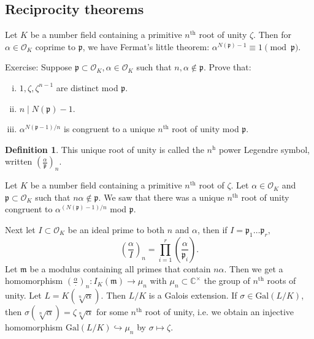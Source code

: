 \documentclass{article}
\theoremstyle{definition}
\newtheorem{defn}[theorem]{Definition}
\begin{document}
\subsection{Reciprocity theorems}
Let $K$ be a number field containing a primitive $n^{\text{th}}$ root of unity $\zeta$. Then for $\alpha \in \mathcal{O}_K$ coprime to $\mathfrak{p}$, we have Fermat's little theorem: $\alpha^{N(\mathfrak{p})-1} \equiv 1 \pmod{\mathfrak{p}}$.
\vspace{1mm}
 
Exercise: Suppose $\mathfrak{p} \subset \mathcal{O}_K, \alpha \in \mathcal{O}_K$ such that $n, \alpha \not\in \mathfrak{p}$. Prove that:
\begin{enumerate}[(i)]
    \item $1, \zeta,\zeta^{n-1}$ are distinct mod $\mathfrak{p}$.
    \item $n \mid N(\mathfrak{p})-1$.
    \item $\alpha^{N(\mathfrak{p}-1)/n}$ is congruent to a unique $n^{\text{th}}$ root of unity mod $\mathfrak{p}$.
\end{enumerate} 
\begin{defn}
    This unique root of unity is called the $n^{\text{h}}$ power Legendre symbol, written $\left(\frac{\alpha}{\mathfrak{p}}\right)_n$.
\end{defn}
Let $K$ be a number field containing a primitive $n^{\text{th}}$ root of $\zeta$. Let $\alpha \in \mathcal{O}_K$ and $\mathfrak{p} \subset \mathcal{O}_K$ such that $n \alpha \not\in \mathfrak{p}$. We saw that there was a unique $n^{\text{th}}$ root of unity congruent to $\alpha^{(N(\mathfrak{p})-1)/n}$ mod $\mathfrak{p}$.
\vspace{1mm}
 
Next let $I \subset \mathcal{O}_K$ be an ideal prime to both $n$ and $\alpha$, then if $I = \mathfrak{p}_1\ldots \mathfrak{p}_r, $\[
\left(\frac{\alpha}{I}\right)_n = \prod_{i=1}^{r} \left(\frac{\alpha}{\mathfrak{p}_i}\right).
\]
Let $\mathfrak{m}$ be a modulus containing all primes that contain $n \alpha$. Then we get a homomorphism $\left(\frac{\alpha}{\cdot }\right)_{n} : I_K(\mathfrak{m}) \to  \mu_n$ with $\mu_n \subset \mathbb{C}^\times$ the group of $n^{\text{th}}$ roots of unity. Let $L = K(\sqrt[n]{\alpha})$. Then $L/K$ is a Galois extension. If $\sigma \in \text{Gal}(L/K)$, then $\sigma(\sqrt[n]{\alpha}) = \zeta \sqrt[n]{\alpha}$ for some $n^{\text{th}}$ root of unity, i.e. we obtain an injective homomorphism $\text{Gal}(L/K) \hookrightarrow \mu_n$ by $\sigma \mapsto \zeta$.
\vspace{1mm}
 
\end{document}
